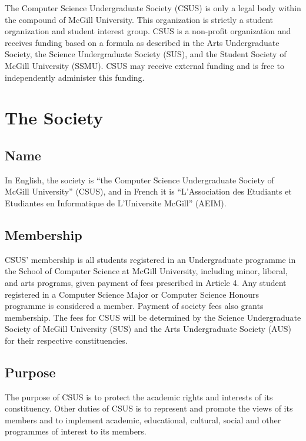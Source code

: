 The Computer Science Undergraduate Society (CSUS) is only a legal body
within the compound of McGill University. This organization is strictly
a student organization and student interest group. CSUS is a non-profit
organization and receives funding based on a formula as described in the
Arts Undergraduate Society, the Science Undergraduate Society (SUS), and
the Student Society of McGill University (SSMU). CSUS may receive
external funding and is free to independently administer this funding.

\section{The Society}\label{the-society}

\subsection{Name}\label{name}

In English, the society is ``the Computer Science Undergraduate Society
of McGill University'' (CSUS), and in French it is ``L'Association des
Etudiants et Etudiantes en Informatique de L'Universite McGill'' (AEIM).

\subsection{Membership}\label{membership}

CSUS' membership is all students registered in an Undergraduate
programme in the School of Computer Science at McGill University,
including minor, liberal, and arts programs, given payment of fees
prescribed in Article 4. Any student registered in a Computer Science
Major or Computer Science Honours programme is considered a member.
Payment of society fees also grants membership. The fees for CSUS will
be determined by the Science Undergraduate Society of McGill University
(SUS) and the Arts Undergraduate Society (AUS) for their respective
constituencies.

\subsection{Purpose}\label{purpose}

The purpose of CSUS is to protect the academic rights and interests of
its constituency. Other duties of CSUS is to represent and promote the
views of its members and to implement academic, educational, cultural,
social and other programmes of interest to its members.

